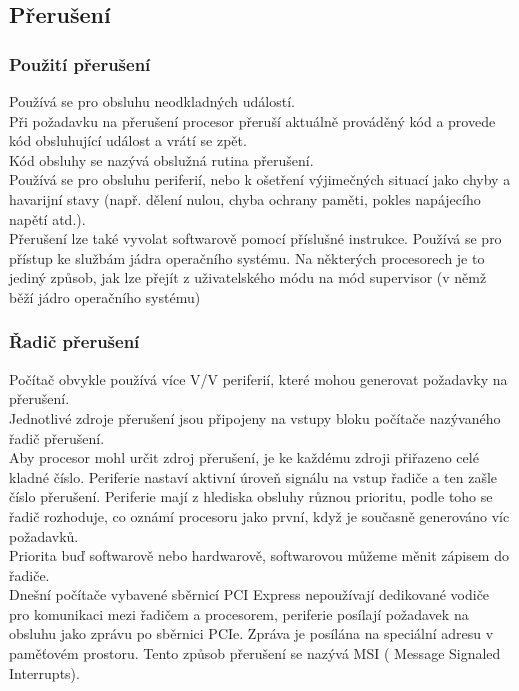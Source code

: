 \subsection{Přerušení}
\subsubsection*{Použití přerušení}
Používá se pro obsluhu neodkladných událostí. \\
Při požadavku na přerušení procesor přeruší aktuálně prováděný kód a provede kód obsluhující událost a vrátí se zpět.\\
Kód obsluhy se nazývá obslužná rutina přerušení.\\
Používá se pro obsluhu periferií, nebo k ošetření výjimečných situací jako chyby a havarijní stavy (např. dělení nulou, chyba ochrany paměti, pokles napájecího napětí atd.).\\
Přerušení lze také vyvolat softwarově pomocí příslušné instrukce. Používá se pro přístup ke službám jádra operačního systému. Na některých procesorech je to jediný způsob, jak lze přejít z uživatelského módu na mód supervisor (v němž běží jádro operačního systému)

\subsubsection*{Řadič přerušení}
Počítač obvykle používá více V/V periferií, které mohou generovat požadavky na přerušení.\\
Jednotlivé zdroje přerušení jsou připojeny na vstupy bloku počítače nazývaného řadič přerušení.\\
Aby procesor mohl určit zdroj přerušení, je ke každému zdroji přiřazeno celé kladné číslo. Periferie nastaví aktivní úroveň signálu na vstup řadiče a ten zašle číslo přerušení. Periferie mají z hlediska obsluhy různou prioritu, podle toho se řadič rozhoduje, co oznámí procesoru jako první, když je současně generováno víc požadavků.\\
Priorita buď softwarově nebo hardwarově, softwarovou můžeme měnit zápisem do řadiče.\\
Dnešní počítače vybavené sběrnicí PCI Express nepoužívají dedikované vodiče pro komunikaci mezi řadičem a procesorem, periferie posílají požadavek na obsluhu jako zprávu po sběrnici PCIe. Zpráva je posílána na speciální adresu v paměťovém prostoru. Tento způsob přerušení se nazývá MSI ( Message Signaled Interrupts).

